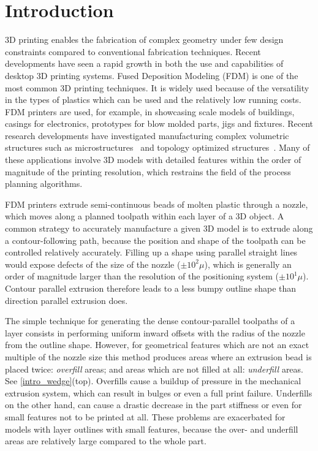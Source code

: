 \section{Introduction}
3D printing enables the fabrication of complex geometry under few design constraints compared to conventional fabrication techniques.
Recent developments have seen a rapid growth in both the use and capabilities of desktop 3D printing systems.
Fused Deposition Modeling (FDM) is one of the most common 3D printing techniques.
It is widely used because of the versatility in the types of plastics which can be used and the relatively low running costs.
FDM printers are used, for example, in showcasing scale models of buildings, casings for electronics, prototypes for blow molded parts, jigs and fixtures.
Recent research developments have investigated manufacturing complex volumetric structures such as microstructures~\cite{bates2018compressive,Liu2019a,Al-Ketan2018,Maskery2018} and topology optimized structures~\cite{Zong2019,Wu2019a,Cheng2019}.
Many of these applications involve 3D models with detailed features within the order of magnitude of the printing resolution, which restrains the field of the process planning algorithms.

FDM printers extrude semi-continuous beads of molten plastic through a nozzle, which moves along a planned toolpath within each layer of a 3D object.
A common strategy to accurately manufacture a given 3D model is to extrude along a contour-following path,
because the position and shape of the toolpath can be controlled relatively accurately.
Filling up a shape using parallel straight lines would expose defects of the size of the nozzle ($\pm 10^2 \mu$), which is generally an order of magnitude larger than the resolution of the positioning system ($\pm 10^1 \mu$).
Contour parallel extrusion therefore leads to a less bumpy outline shape than direction parallel extrusion does.


The simple technique for generating the dense contour-parallel toolpaths of a layer consists in performing uniform inward offsets with the radius of the nozzle from the outline shape.
However, for geometrical features which are not an exact multiple of the nozzle size this method produces areas where an extrusion bead is placed twice: \emph{overfill} areas; and areas which are not filled at all: \emph{underfill} areas.
See \cref{intro_wedge}(top).
Overfills cause a buildup of pressure in the mechanical extrusion system, which can result in bulges or even a full print failure.
Underfills on the other hand, can cause a drastic decrease in the part stiffness or even for small features not to be printed at all.
These problems are exacerbated for models with layer outlines with small features, because the over- and underfill areas are relatively large compared to the whole part.

